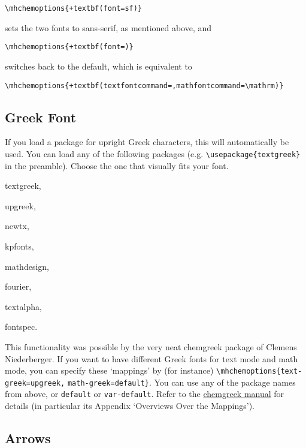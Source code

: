 \documentclass[a4paper,notitlepage,parskip=half]{scrreprt}
\begin{document}
\begin{Verbatim}[commandchars=+()]
  \mhchemoptions{+textbf(font=sf)}
\end{Verbatim}

sets the two fonts to sans-serif, as mentioned above, and

\begin{Verbatim}[commandchars=+()]
  \mhchemoptions{+textbf(font=)}
\end{Verbatim}

switches back to the default, which is equivalent to

\begin{Verbatim}[commandchars=+()]
  \mhchemoptions{+textbf(textfontcommand=,mathfontcommand=\mathrm)}
\end{Verbatim}


\subsection{Greek Font} \label{sec:GreekFont}

If you load a package for upright Greek characters, this will automatically be used. You can load any of the following packages (e.g. \verb|\usepackage{textgreek}| in the preamble). Choose the one that visually fits your font.
\begin{compactitem}[--]
  \item textgreek,
  \item upgreek,
  \item newtx,
  \item kpfonts,
  \item mathdesign,
  \item fourier,
  \item textalpha,
  \item fontspec.
\end{compactitem}
\sloppypar This functionality was possible by the very neat chemgreek package of Clemens Niederberger. If you want to have different Greek fonts for text mode and math mode, you can specify these `mappings' by (for instance) \verb|\mhchemoptions{text-greek=upgreek,| \verb|math-greek=default}|. You can use any of the package names from above, or \verb|default| or \verb|var-default|. Refer to the	 \href{http://mirrors.ctan.org/macros/latex/contrib/chemgreek/chemgreek_en.pdf}{chemgreek manual} for details (in particular its Appendix `Overviews Over the Mappings').


\subsection{Arrows}
\end{document}
